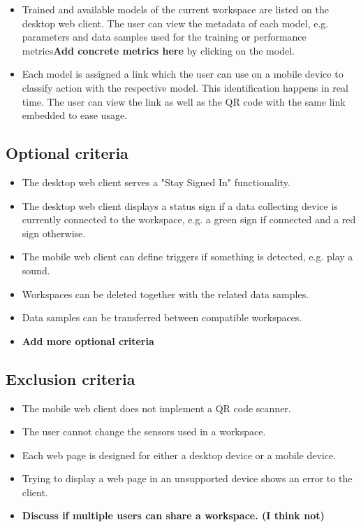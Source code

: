 \begin{itemize}
    \item Trained and available models of the current workspace are listed on the desktop web client. The user can view the metadata of each model, e.g. parameters and data samples used for the training or performance metrics\textbf{Add concrete metrics here} by clicking on the model.
    \item Each model is assigned a link which the user can use on a mobile device to classify action with the respective model. This identification happens in real time. The user can view the link as well as the QR code with the same link embedded to ease usage.
\end{itemize}

\subsection{Optional criteria}
\begin{itemize}
    \item The desktop web client serves a "Stay Signed In" functionality.
    \item The desktop web client displays a status sign if a data collecting device is currently connected to the workspace, e.g. a green sign if connected and a red sign otherwise.
    \item The mobile web client can define triggers if something is detected, e.g. play a sound.
    \item Workspaces can be deleted together with the related data samples.
    \item Data samples can be transferred between compatible workspaces.
    \item \textbf{Add more optional criteria}
\end{itemize}

\subsection{Exclusion criteria}
\begin{itemize}
    \item The mobile web client does not implement a QR code scanner.
    \item The user cannot change the sensors used in a workspace.
    \item Each web page is designed for either a desktop device or a mobile device.
    \item Trying to display a web page in an unsupported device shows an error to the client.
    \item \textbf{Discuss if multiple users can share a workspace. (I think not)}
\end{itemize}
